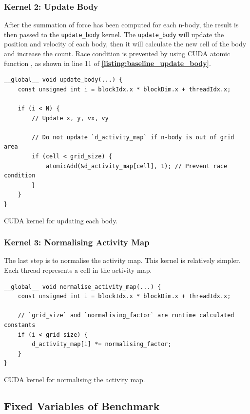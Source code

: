 \documentclass[12pt, a4paper]{article}
\let\oldcref\cref
\renewcommand{\cref}[1]{\textbf{\oldcref{#1}}}
\begin{document}
\subsubsection{Kernel 2: Update Body}
After the summation of force has been computed for each n-body, the result is then passed to the
\texttt{update\_body} kernel. The \texttt{update\_body} will update the position and velocity of
each body, then it will calculate the new cell of the body and increase the count. Race condition is
prevented by using CUDA atomic function \cite{atomic_func}, as shown in line 11 of
\cref{listing:baseline_update_body}.

\begin{listing}[ht]
  \begin{verbatim}
__global__ void update_body(...) {
    const unsigned int i = blockIdx.x * blockDim.x + threadIdx.x;

    if (i < N) {
        // Update x, y, vx, vy

        // Do not update `d_activity_map` if n-body is out of grid area
        if (cell < grid_size) {
            atomicAdd(&d_activity_map[cell], 1); // Prevent race condition
        }
    }
}
  \end{verbatim}
  \caption{CUDA kernel for updating each body.}
  \label{listing:baseline_update_body}
\end{listing}

\subsubsection{Kernel 3: Normalising Activity Map}
The last step is to normalise the activity map. This kernel is relatively simpler. Each thread
represents a cell in the activity map.
\begin{listing}[ht]
  \begin{verbatim}
__global__ void normalise_activity_map(...) {
    const unsigned int i = blockIdx.x * blockDim.x + threadIdx.x;

    // `grid_size` and `normalising_factor` are runtime calculated constants
    if (i < grid_size) {
        d_activity_map[i] *= normalising_factor;
    }
}
  \end{verbatim}
  \caption{CUDA kernel for normalising the activity map.}
\end{listing}

\pagebreak
\subsection{Fixed Variables of Benchmark}
\end{document}
